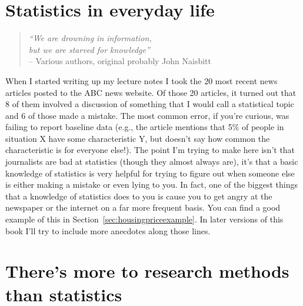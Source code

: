 \section{Statistics in everyday life}

\begin{quote}
{\it ``We are drowning in information,\\ but we are starved for knowledge''} \\
\hspace*{2cm} -- Various authors, original probably John Naisbitt
\end{quote}

\noindent
When I started writing up my lecture notes I took the 20 most recent news articles posted to the ABC news website. Of those 20 articles, it turned out that 8 of them involved a discussion of something that I would call a statistical topic and 6 of those made a mistake. The most common error, if you're curious, was failing to report baseline data (e.g., the article mentions that 5\% of people in situation X have some characteristic Y, but doesn't say how common the characteristic is for everyone else!). The point I'm trying to make here isn't that journalists are bad at statistics (though they almost always are), it's that a  basic knowledge of statistics is very helpful for trying to figure out when someone else is either making a mistake or even lying to you. In fact, one of the biggest things that a knowledge of statistics does to you is cause you to get angry at the newspaper or the internet on a far more frequent basis. You can find a good example of this in Section~\ref{sec:housingpriceexample}. In later versions of this book I'll try to include more anecdotes along those lines. 


\section{There's more to research methods than statistics}

